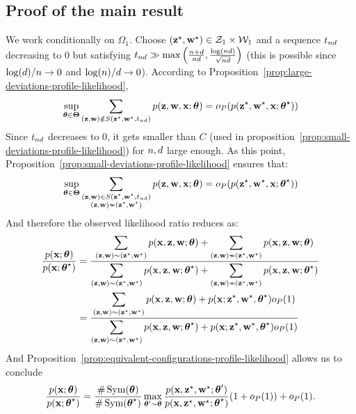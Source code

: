 \documentclass[]{imsart}
\newcommand{\1}{\mathds{1}}
\numberwithin{equation}{section}
\theoremstyle{plain}
\theoremstyle{remark}
\begin{document}
\subsection{Proof of the main result}\label{sec:proofbigth}

\proofbegin We work conditionally on $\Omega_1$. Choose $(\mathbf{z}^\star, \mathbf{w}^\star)
\in \mathcal{Z}_1\times \mathcal{W}_1$ and a sequence $t_{nd}$ decreasing to $0$ but satisfying $t_{nd} \gg \max\left(\frac{n+d}{nd}, \frac{\log(nd)}{\sqrt{nd}}\right)$ (this is possible since $\log(d)/n\rightarrow 0$ and $\log(n)/d\rightarrow 0$). According to Proposition~\ref{prop:large-deviations-profile-likelihood}, 
\begin{equation*}
    \sup_{\btheta \in \bTheta} \sum_{(\bz, \bw) \notin S(\bzs, \bws, \tnd)} \prob(\bz, \bw, \bx; \btheta) = \smallO_P( \prob(\bzs, \bws, \bx; \bthetas) )
\end{equation*}
Since $t_{nd}$ decreases to $0$, it gets smaller than $C$ (used in proposition~\ref{prop:small-deviations-profile-likelihood}) for $n, d$ large enough. As this point, Proposition~\ref{prop:small-deviations-profile-likelihood} ensures that:
\begin{equation*}
    \sup_{\btheta \in \bTheta} \sum_{\substack{(\bz, \bw) \in S(\bzs, \bws, \tnd) \\ (\bz, \bw) \nsim (\bzs, \bws)}} \prob(\bz, \bw, \bx; \btheta) = \smallO_P( \prob(\bzs, \bws, \bx; \bthetas) )
\end{equation*}
And therefore the observed likelihood ratio reduces as:
\begin{align*}
    \frac{\prob(\bx; \btheta)}{\prob(\bx; \bthetas)} & = \frac{\displaystyle \sum_{(\bz, \bw) \sim (\bzs, \bws)} \prob(\bx, \bz, \bw; \btheta) + \sum_{(\bz, \bw) \nsim (\bzs, \bws)} \prob(\bx, \bz, \bw; \btheta)}{\displaystyle \sum_{(\bz, \bw) \sim (\bzs, \bws)} \prob(\bx, \bz, \bw; \bthetas) + \sum_{(\bz, \bw) \nsim (\bzs, \bws)} \prob(\bx, \bz, \bw; \bthetas)} \\
    & = \frac{\displaystyle \sum_{(\bz, \bw) \sim (\bzs, \bws)} \prob(\bx, \bz, \bw; \btheta) + \prob(\bx; \bzs, \bws, \bthetas) \smallO_P(1)}{\displaystyle \sum_{(\bz, \bw) \sim (\bzs, \bws)} \prob(\bx, \bz, \bw; \bthetas) + \prob(\bx; \bzs, \bws, \bthetas) \smallO_P(1)} \\
\end{align*}
And Proposition~\ref{prop:equivalent-configurations-profile-likelihood} allows us to conclude
\begin{equation*}
    \frac{\prob(\bx; \btheta)}{\prob(\bx; \bthetas)} = \frac{\# \Symmetric(\btheta)}{\# \Symmetric(\bthetas)} \max_{\btheta' \sim \btheta} \frac{\prob(\bx, \bzs, \bws; \btheta')}{\prob(\bx, \bzs, \bws; \bthetas)}(1 + \smallO_P(1)) + \smallO_P(1).
\end{equation*} \proofend
\end{document}
